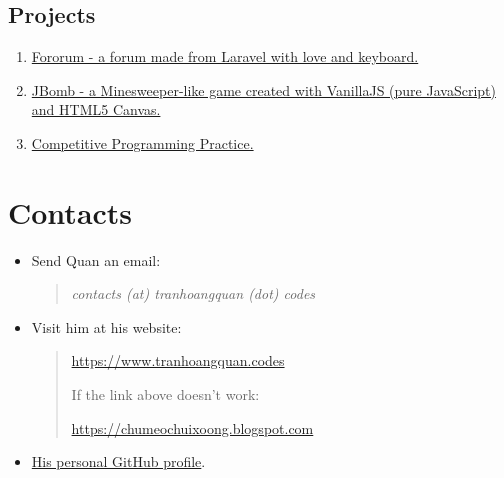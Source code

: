 \documentclass{article}
\begin{document}
       \subsection{Projects}
           \begin{enumerate}
               \item \href{https://github.com/trhgquan/Fororum}{Fororum - a forum made from Laravel with love and keyboard.}
               \item \href{https://github.com/trhgquan/JBomb}{JBomb - a Minesweeper-like game created with VanillaJS (pure JavaScript) and HTML5 Canvas.}
               \item \href{https://github.com/trhgquan/CPP}{Competitive Programming Practice.}
           \end{enumerate}

    \section{Contacts}
        \begin{itemize}
            \item Send Quan an email:
            \begin{quote}
                \itshape{contacts (at) tranhoangquan (dot) codes}
            \end{quote}
            \item Visit him at his website:
            \begin{quote}
                \href{https://www.tranhoangquan.codes}{https://www.tranhoangquan.codes}

                If the link above doesn't work:

                \href{https://chumeochuixoong.blogspot.com}{https://chumeochuixoong.blogspot.com}
            \end{quote}
            \item \href{https://github.com/trhgquan}{His personal GitHub profile}.
        \end{itemize}
\end{document}
